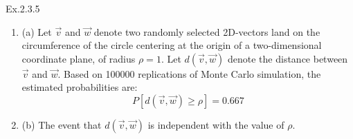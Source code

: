 \documentclass[11pt]{article}
\theoremstyle{definition}
\begin{document}
\begin{enumerate}[leftmargin=0pt, itemsep=3ex]
    \problemitem Ex.2.3.5
    
        \begin{enumerate}
            \item (a) Let $\overrightarrow{v}$ and $\overrightarrow{w}$ denote two randomly selected 2D-vectors land on the circumference of the circle centering at the origin of a two-dimensional coordinate plane, of radius $\rho = 1$.
            Let $d(\overrightarrow{v},\overrightarrow{w})$ denote the distance between $\overrightarrow{v}$ and $\overrightarrow{w}$.
    Based on 100000 replications of Monte Carlo simulation, the estimated probabilities are:
    $$P[d(\overrightarrow{v},\overrightarrow{w}) \geqslant \rho] = 0.667$$
    \item (b) The event that $d(\overrightarrow{v},\overrightarrow{w})$ is independent with the value of $\rho$.
        \end{enumerate}
    
\end{enumerate}
\end{document}
